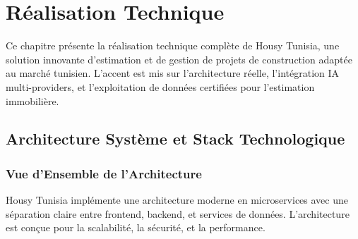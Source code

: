 
\chapter{Réalisation Technique}
\label{chap:realisation_technique}

\begin{objectivebox}
Ce chapitre présente la réalisation technique complète de Housy Tunisia, une solution innovante d'estimation et de gestion de projets de construction adaptée au marché tunisien. L'accent est mis sur l'architecture réelle, l'intégration IA multi-providers, et l'exploitation de données certifiées pour l'estimation immobilière.
\end{objectivebox}


\section{Architecture Système et Stack Technologique}

\subsection{Vue d'Ensemble de l'Architecture}

Housy Tunisia implémente une architecture moderne en microservices avec une séparation claire entre frontend, backend, et services de données. L'architecture est conçue pour la scalabilité, la sécurité, et la performance.


